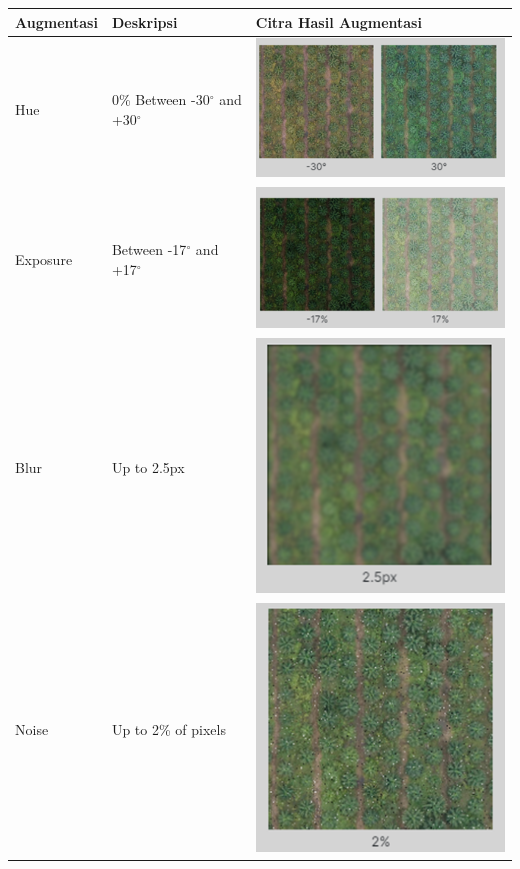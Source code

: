 \begin{singlespace}
	\begin{table}[H]
		\centering
		\begin{tabular}{|m{3cm}|m{3cm}|m{6cm}|}
			\hline
			\rowcolor[HTML]{D9D9D9} 
			Augmentasi & Deskripsi                                                                & Citra Hasil Augmentasi \\ \hline
			
			
			Hue & 0\% Between -30$^{\circ}$ and +30$^{\circ}$ & \includegraphics[width=0.4\columnwidth]{bab4/Gambar/tbl-5-pic3.png}\\ \hline
			
			Exposure & Between -17$^{\circ}$ and +17$^{\circ}$ & \includegraphics[width=0.4\columnwidth]{bab4/Gambar/tbl-5-pic4.png}\\ \hline
			
			Blur & Up to 2.5px & \includegraphics[width=0.4\columnwidth]{bab4/Gambar/tbl-5-pic5.png}\\ \hline
			
			Noise & Up to 2\% of pixels & \includegraphics[width=0.4\columnwidth]{bab4/Gambar/tbl-5-pic6.png}\\ \hline
		\end{tabular}
	\end{table}
\end{singlespace}
